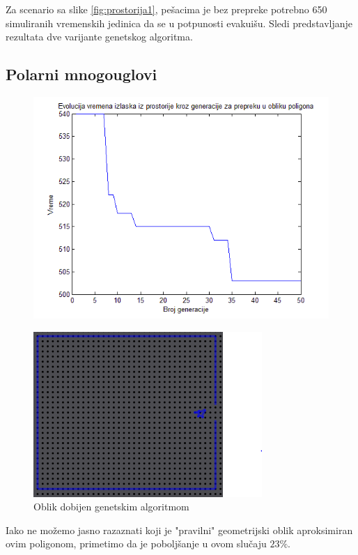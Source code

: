 \documentclass[12pt]{article}
\begin{document}
Za scenario sa slike \ref{fig:prostorija1}, pešacima je bez prepreke potrebno 650 simuliranih vremenskih jedinica da se u potpunosti evakuišu. Sledi predstavljanje rezultata dve varijante genetskog algoritma.

\subsection*{Polarni mnogouglovi}

\begin{figure}
\centering
\includegraphics[scale=.6]{polygon-plot}
\end{figure}

\begin{figure}
\centering
\includegraphics{polygon2}
\caption{Oblik dobijen genetskim algoritmom}
\label{fig:polygon2}
\end{figure}

Iako ne možemo jasno razaznati koji je "pravilni" geometrijski oblik aproksimiran ovim poligonom, primetimo da je poboljšanje u ovom slučaju $23\%$.
\end{document}
